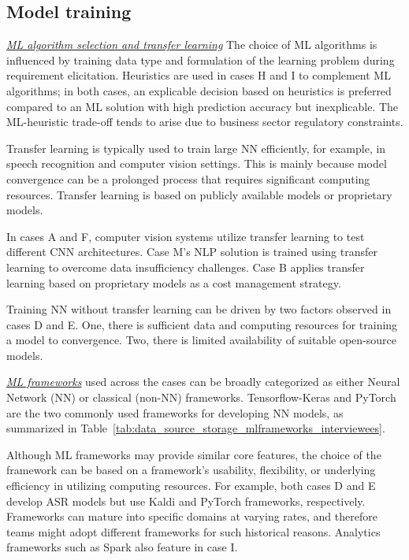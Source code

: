 \subsection{Model training}

\underline{\emph{ML algorithm selection and transfer learning}}
The choice of ML algorithms is influenced by training data type and formulation of the learning problem during requirement elicitation. Heuristics are used in cases H and I to complement ML algorithms; in both cases, an explicable decision based on heuristics is preferred compared to an ML solution with high prediction accuracy but inexplicable. The ML-heuristic trade-off tends to arise due to business sector regulatory constraints.

Transfer learning is typically used to train large NN efficiently, for example, in speech recognition and computer vision settings. This is mainly because model convergence can be a prolonged process that requires significant computing resources. Transfer learning is based on publicly available models or proprietary models.

In cases A and F, computer vision systems utilize transfer learning to test different CNN architectures. Case M's NLP solution is trained using transfer learning to overcome data insufficiency challenges. Case B applies transfer learning based on proprietary models as a cost management strategy. 

Training NN without transfer learning can be driven by two factors observed in cases D and E. One, there is sufficient data and computing resources for training a model to convergence. Two, there is limited availability of suitable open-source models.

\underline{\emph{ML frameworks}}
used across the cases can be broadly categorized as either Neural Network (NN) or classical (non-NN) frameworks. Tensorflow-Keras and PyTorch are the two commonly used frameworks for developing NN models, as summarized in  Table~\ref{tab:data_source_storage_mlframeworks_interviewees}.

Although ML frameworks may provide similar core features, the choice of the framework can be based on a framework's usability, flexibility, or underlying efficiency in utilizing computing resources. For example, both cases D and E develop ASR models but use Kaldi and PyTorch frameworks, respectively. 
Frameworks can mature into specific domains at varying rates, and therefore teams might adopt different frameworks for such historical reasons. Analytics frameworks such as Spark also feature in case I. 


